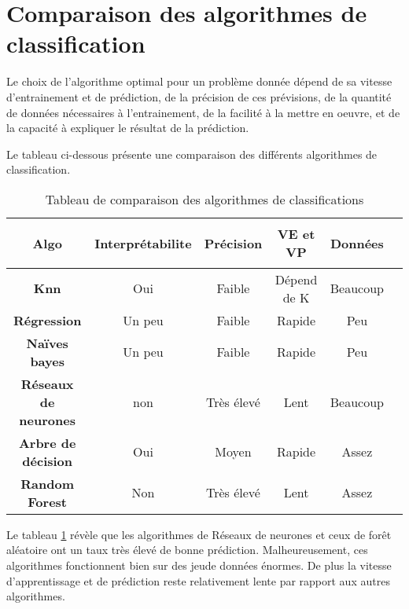 \section{Comparaison des algorithmes de classification}

Le choix de l'algorithme optimal pour un problème donnée dépend de sa vitesse
d'entrainement et de prédiction, de la précision de ces prévisions, de la
quantité de données nécessaires à l'entrainement, de la facilité à la mettre en
oeuvre, et de la capacité à expliquer le résultat de la prédiction.

Le tableau ci-dessous présente une comparaison des différents algorithmes de
classification.

\begin{table}
  \begin{center}
    \renewcommand{\arraystretch}{1.5}

    \begin{tabular}{|c|c|c|c|c|c|}
      \hline
      \rowcolor[gray]{0.7}
      \bf\rule[-0.4cm]{0mm}{1cm} Algo & \bf Interprétabilite & \bf Précision & \bf{VE et VP} & \bf Données \\
      \hline
     \bf Knn & Oui & Faible & Dépend de K & Beaucoup \\
      \hline
     \bf Régression & Un peu & Faible & Rapide & Peu \\
      \hline
     \bf Naïves bayes & Un peu & Faible & Rapide & Peu \\
      \hline
     \bf Réseaux de neurones & non & Très élevé & Lent & Beaucoup \\
      \hline
      \bf{Arbre de décision} & Oui & Moyen & Rapide & Assez \\
      \hline
      \bf{Random Forest} & Non & Très élevé & Lent & Assez \\
      \hline
    \end{tabular}
    \caption{Tableau de comparaison des algorithmes de classifications}
    \label{tab:tab2}
  \end{center}
\end{table}
Le tableau \ref{tab:tab2} révèle que les algorithmes de Réseaux de neurones et ceux de forêt
aléatoire ont un taux très élevé de bonne prédiction. Malheureusement, ces
algorithmes fonctionnent bien sur des jeude données énormes. De plus la vitesse
d'apprentissage et de prédiction reste relativement lente par rapport aux
autres algorithmes.


